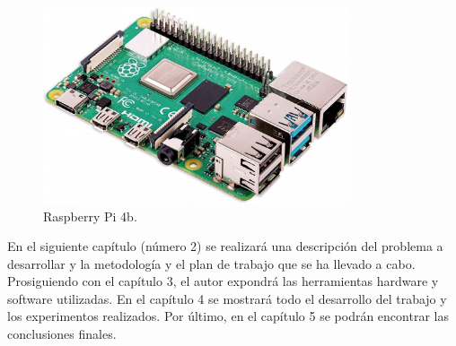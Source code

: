 \begin{figure} [h!]
  \begin{center}
    \includegraphics[width=9cm]{figs/raspberry.jpg}
  \end{center}
  \caption{Raspberry Pi 4b.}
  \label{fig:raspberry}
\end{figure}

En el siguiente capítulo (número 2) se realizará una descripción del problema a desarrollar y la metodología y el plan de trabajo que se ha llevado a cabo. Prosiguiendo con el capítulo 3, el autor expondrá las herramientas hardware y software utilizadas. En el capítulo 4 se mostrará todo el desarrollo del trabajo y los experimentos realizados. Por último, en el capítulo 5 se podrán encontrar las conclusiones finales.






